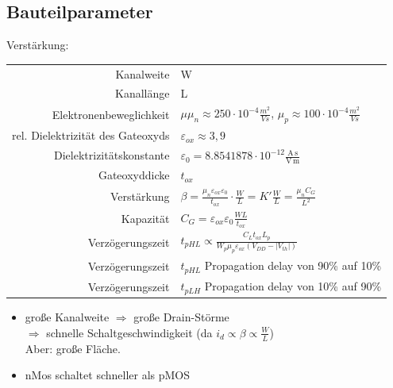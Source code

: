 \documentclass[6pt,a4paper]{scrartcl}
\newcommand{\Ra}[0]{\ensuremath{\Rightarrow}}									%
\begin{document}
\begin{multicols*}{3}
	\subsection{Bauteilparameter}
	Verstärkung:  \\
	\begin{tabular} {r | l}
		Kanalweite & W  \\
		Kanallänge & L  \\
		Elektronenbeweglichkeit & $\mu$\quad $\mu_n \approx 250 \cdot 10^{-4} \frac{m^2}{Vs}$, $\mu_p \approx 100 \cdot 10^{-4} \frac{m^2}{Vs}$ \\
		rel. Dielektrizität des Gateoxyds & $\varepsilon_{ox} \approx 3,9$ \\
		Dielektrizitätskonstante & $\varepsilon_0 = 8.8541878 \cdot 10^{-12} \frac{\mathrm{A\,s}}{\mathrm{V\,m}}$ \\
		Gateoxyddicke & $t_{ox}$ \\
		Verstärkung & $\beta = \frac{\mu_n \varepsilon_{ox} \varepsilon_0}{t_{ox}} \cdot \frac{W}{L} = K' \frac{W}{L} = \frac{\mu_n C_G}{L^2}$ \\
		Kapazität & $C_G = \varepsilon_{ox} \varepsilon_0 \frac{WL}{t_{ox}}$ \\
		Verzögerungszeit & $t_{pHL} \propto \frac{C_L t_{ox} L_p}{W_p \mu_p \varepsilon_{ox} (V_{DD} - |V_{th}|)}$ \\
		Verzögerungszeit & $t_{pHL}$ Propagation delay von 90\% auf 10\% \\
		Verzögerungszeit & $t_{pLH}$ Propagation delay von 10\% auf 90\%
	\end{tabular}
	\begin{itemize}
		\item große Kanalweite $\Ra$ große Drain-Störme \\ $\Ra$ schnelle Schaltgeschwindigkeit (da $i_d \propto \beta \propto \frac{W}{L}$) \\
		Aber: große Fläche.
		\item nMos schaltet schneller als pMOS
	\end{itemize}


\end{multicols*}
\end{document}
